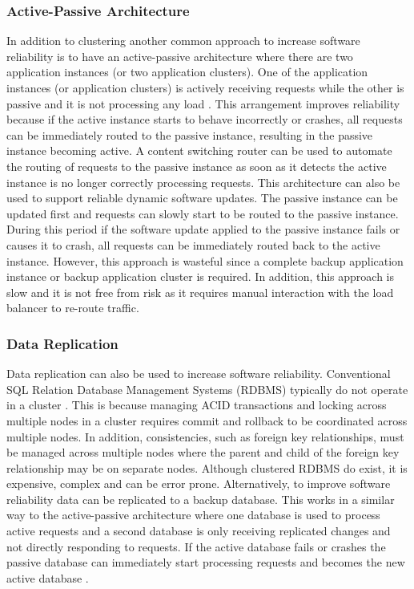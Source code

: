 \documentclass[a4paper,11pt,twoside]{article}
\begin{document}
\subsubsection{Active-Passive Architecture}
In addition to clustering another common approach to increase software reliability is to have an active-passive architecture where there are two application instances  (or two application clusters). One of the application instances (or application clusters) is actively receiving requests while the other is passive and it is not processing any load \cite{active_passive}. This arrangement improves reliability because if the active instance starts to behave incorrectly or crashes, all requests can be immediately routed to the passive instance, resulting in the passive instance becoming active. A content switching router can be used to automate the routing of requests to the passive instance as soon as it detects the active instance is no longer correctly processing requests. This architecture can also be used to support reliable dynamic software updates. The passive instance can be updated first and requests can slowly start to be routed to the passive instance. During this period if the software update applied to the passive instance fails or causes it to crash, all requests can be immediately routed back to the active instance. However, this approach is wasteful since a complete backup application instance or backup application cluster is required. In addition, this approach is slow and it is not free from risk as it requires manual interaction with the load balancer to re-route traffic.

\subsubsection{Data Replication}
Data replication can also be used to increase software reliability. Conventional SQL Relation Database Management Systems (RDBMS) typically do not operate in a cluster \cite{Replication}. This is because managing ACID transactions and locking across multiple nodes in a cluster requires commit and rollback to be coordinated across multiple nodes. In addition, consistencies, such as foreign key relationships, must be managed across multiple nodes where the parent and child of the foreign key relationship may be on separate nodes. Although clustered RDBMS do exist, it is expensive, complex and can be error prone. Alternatively, to improve software reliability data can be replicated to a backup database. This works in a similar way to the active-passive architecture where one database is used to process active requests and a second database is only receiving replicated changes and not directly responding to requests. If the active database fails or crashes the passive database can immediately start processing requests and becomes the new active database  \cite{Replication}.
\end{document}
